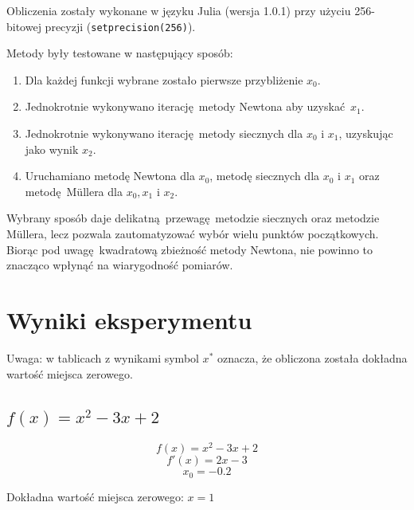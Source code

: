 \documentclass[12pt]{article}
\begin{document}
Obliczenia zostały wykonane w języku Julia (wersja 1.0.1) przy użyciu 
256-bitowej precyzji (\texttt{setprecision(256)}).\newline

Metody były testowane w następujący sposób:
\begin{enumerate}
    \item Dla każdej funkcji wybrane zostało pierwsze przybliżenie $x_0$.
    \item Jednokrotnie wykonywano iterację metody Newtona aby uzyskać $x_1$.
    \item Jednokrotnie wykonywano iterację metody siecznych dla $x_0$ i $x_1$,
            uzyskując jako wynik $x_2$.
    \item Uruchamiano metodę Newtona dla $x_0$, metodę siecznych dla $x_0$ 
            i $x_1$ oraz metodę Müllera dla $x_0, x_1$ i $x_2$.
\end{enumerate}

Wybrany sposób daje delikatną przewagę metodzie siecznych oraz metodzie
Müllera, lecz pozwala zautomatyzować wybór wielu punktów początkowych. Biorąc
pod uwagę kwadratową zbieżność metody Newtona, nie powinno to znacząco
wpłynąć na wiarygodność pomiarów.

\section{Wyniki eksperymentu}

Uwaga: w tablicach z wynikami symbol $x^*$ oznacza, że obliczona została
dokładna wartość miejsca zerowego.

\subsection{$f(x) = x^2 - 3x + 2$}

\[f(x) = x^2 - 3x + 2\]
\[f'(x) = 2x - 3\]
\[x_0 = -0.2\]
\begin{center}
    Dokładna wartość miejsca zerowego: $x = 1$
\end{center}
\end{document}

